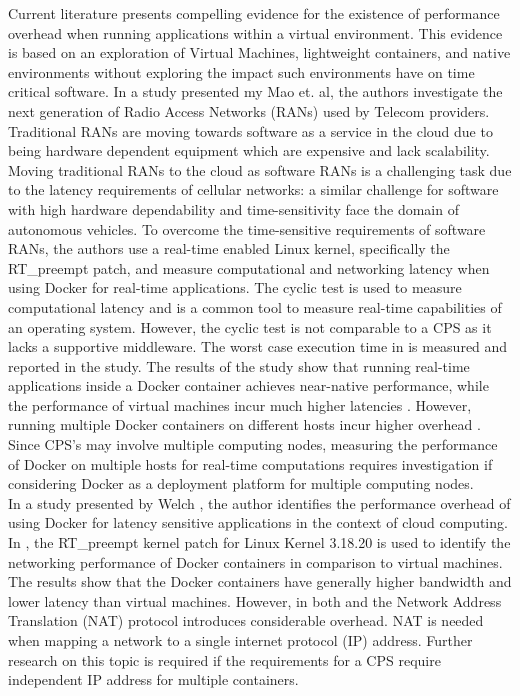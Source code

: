 Current literature \cite{p6} presents compelling evidence for the existence of performance overhead when running applications within a virtual environment. This evidence is based on an exploration of Virtual Machines, lightweight containers, and native environments without exploring the impact such environments have on time critical software. In a study presented my Mao et. al, the authors investigate the next generation of Radio Access Networks (RANs) used by Telecom providers. Traditional RANs are moving towards software as a service in the cloud \cite{p1} due to being hardware dependent equipment which are expensive and lack scalability. Moving traditional RANs to the cloud as software RANs is a challenging task due to the latency requirements of cellular networks: a similar challenge for software with high hardware dependability and time-sensitivity face the domain of autonomous vehicles. To overcome the time-sensitive requirements of software RANs, the authors use a real-time enabled Linux kernel, specifically the RT\_preempt patch, and measure computational and networking latency when using Docker for real-time applications. The cyclic test \cite{cycl} is used to measure computational latency and is a common tool to measure real-time capabilities of an operating system. However, the cyclic test is not comparable to a CPS as it lacks a supportive middleware. The worst case execution time in \cite{p1} is measured and reported in the study. The results of the study show that running real-time applications inside a Docker container achieves near-native performance, while the performance of virtual machines incur much higher latencies \cite{p1}. However, running multiple Docker containers on different hosts incur higher overhead \cite{p1}. Since CPS's may involve multiple computing nodes, measuring the performance of Docker on multiple hosts for real-time computations requires investigation if considering Docker as a deployment platform for multiple computing nodes.  \\

In a study presented by Welch \cite{c2}, the author identifies the performance overhead of using Docker for latency sensitive applications in the context of cloud computing. In \cite{c2}, the RT\_preempt kernel patch for Linux Kernel 3.18.20 is used to identify the networking performance of Docker containers in comparison to virtual machines. The results show that the Docker containers have generally higher bandwidth and lower latency than virtual machines. However, in both \cite{Andreas} and \cite{p6} the Network Address Translation (NAT) protocol introduces considerable overhead. NAT is needed when mapping a network to a single internet protocol (IP) address. Further research on this topic is required if the requirements for a CPS require independent IP address for multiple containers. \\

